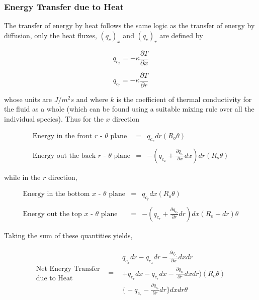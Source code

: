 \subsubsection{Energy Transfer due to Heat}

	The transfer of energy by heat follows the same logic as the transfer of energy by diffusion, only the
heat fluxes, $(q_c)_x$ and $(q_c)_r$ are defined by

\begin{equation}
	q_{c_x} = -\kappa \frac{\partial T}{\partial x} 
\label{eqn:xheatflux}
\end{equation}

\begin{equation}
	q_{c_r} = -\kappa \frac{\partial T}{\partial r}
\label{eqn:rheatflux}
\end{equation}	

	whose units are $J/m^2 s$ and where $k$ is the coefficient of thermal conductivity for the fluid 
as a whole (which can be found using a suitable mixing rule over all the individual species).  Thus for the $x$
direction

\begin{displaymath}
	\begin{array}{ccc}
		\textrm{Energy in the front $r$ - $\theta$ plane} & = & q_{c_x}dr(R_o \theta) 
		\\ & & \\
		\textrm{Energy out the back $r$ - $\theta$ plane} & = & -(q_{c_x} + 
		\frac{\partial q_{c_x}}{\partial x}dx)dr(R_o \theta)
	\end{array}
\end{displaymath}

	while in the $r$ direction,

\begin{displaymath}
	\begin{array}{ccc}
		\textrm{Energy in the bottom $x$ - $\theta$ plane} & = & q_{c_r}dx(R_o \theta) 
		\\ & & \\
		\textrm{Energy out the top $x$ - $\theta$ plane} & = & -(q_{c_r} + \frac{\partial q_{c_r}}
		{\partial r}dr)dx(R_o + dr) \theta
	\end{array}
\end{displaymath}

	Taking the sum of these quantities yields,

\begin{displaymath}
	\begin{array}{ccc}
		\begin{array}{c}
		\textrm{Net Energy Transfer} \\ \textrm{due to Heat}
		\end{array} & = &
			\begin{array}{c}
		q_{c_x}dr - q_{c_x}dr - \frac{\partial q_{c_x}}{\partial x}dxdr \\
		+  q_{c_r}dx - q_{c_r}dx - \frac{\partial q_{c_r}}{\partial r}dxdr)(R_o \theta)
		\\
		\Big\{-q_{c_r} - \frac{\partial q_{c_r}}{\partial r}dr\Big\}dxdr \theta
			\end{array}
	\end{array}
\end{displaymath}

